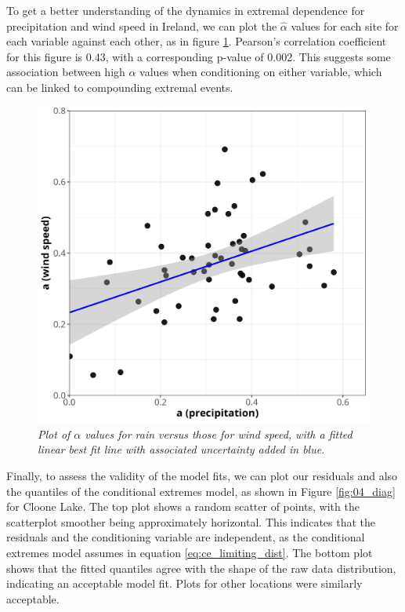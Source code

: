 \documentclass{article}
\numberwithin{equation}{section}
\begin{document}
To get a better understanding of the dynamics in extremal dependence for precipitation and wind speed in Ireland, we can plot the $\hat{\alpha}$ values for each site for each variable against each other, as in figure \ref{fig:04_alpha_rain_vs_ws}.
Pearson's correlation coefficient for this figure is 0.43, with a corresponding p-value of 0.002. 
This suggests some association between high $\alpha$ values when conditioning on either variable, which can be linked to compounding extremal events.

\begin{figure}[H]
    \centering
    \includegraphics[width = 0.7\linewidth]{plots/046_alpha_rain_vs_ws.png}
    \caption{\emph{Plot of $\alpha$ values for rain versus those for wind speed, with a fitted linear best fit line with associated uncertainty added in blue.}}
    \label{fig:04_alpha_rain_vs_ws}
\end{figure}


Finally, to assess the validity of the model fits, we can plot our residuals and also the quantiles of the conditional extremes model, as shown in Figure \ref{fig:04_diag} for Cloone Lake.
The top plot shows a random scatter of points, with the scatterplot smoother being approximately horizontal. 
This indicates that the residuals and the conditioning variable are independent, as the conditional extremes model assumes in equation \eqref{eq:ce_limiting_dist}.
The bottom plot shows that the fitted quantiles agree with the shape of the raw data distribution, indicating an acceptable model fit.
Plots for other locations were similarly acceptable. 
\end{document}
